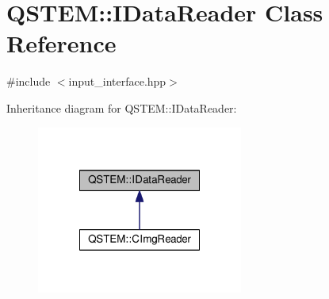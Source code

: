 \hypertarget{class_q_s_t_e_m_1_1_i_data_reader}{\section{Q\-S\-T\-E\-M\-:\-:I\-Data\-Reader Class Reference}
\label{class_q_s_t_e_m_1_1_i_data_reader}
}


{\ttfamily \#include $<$input\-\_\-interface.\-hpp$>$}



Inheritance diagram for Q\-S\-T\-E\-M\-:\-:I\-Data\-Reader\-:
\nopagebreak
\begin{figure}[H]
\begin{center}
\leavevmode
\includegraphics[width=192pt]{class_q_s_t_e_m_1_1_i_data_reader__inherit__graph}
\end{center}
\end{figure}
